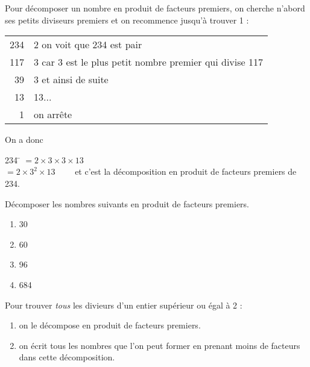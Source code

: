 \documentclass[a4paper,12pt,french]{book}
\begin{document}
\begin{methode}[]
	Pour décomposer un nombre en produit de facteurs premiers, on cherche n'abord ses petits diviseurs premiers et on recommence jusqu'à trouver 1 :
	\begin{center}
		\begin{tabular}{r|l}
			234 & 2 \hspace*{3ex}on voit que 234 est pair\\
			117 & 3 \hspace*{3ex}car 3 est le plus petit nombre premier qui divise 117\\
			39 & 3 \hspace*{3ex}et ainsi de suite \\
			13 & 13\hspace*{3ex}...\\
			1 & \hspace*{4.55ex}on arrête
		\end{tabular}
	\end{center}
	On a donc 	
	\begin{tabbing}
		234 \= $=2\times 3\times 3\times 13$\\ 
		\> $=2\times 3^2\times 13\qquad$ et c'est la décomposition en produit de facteurs premiers de 234.
	\end{tabbing}
\end{methode}



\begin{exercice}[]
	
	Décomposer les nombres suivants en produit de facteurs premiers.
	
	\begin{multicols}{4}
		\begin{enumerate}[\bfseries a.]
			\item 30
			\item 60
			\item 96
			\item 684
		\end{enumerate}
	\end{multicols}
	
\end{exercice}


\begin{methode}
	Pour trouver \textit{tous} les divieurs d'un entier supérieur ou égal à 2 :
	\begin{enumerate}[\bfseries a.]
		\item 	on le décompose en produit de facteurs premiers.
		\item 	on écrit tous les nombres que l'on peut former en prenant \og moins de facteurs\fg{} dans cette décomposition.
	\end{enumerate}
\end{methode}
\end{document}
